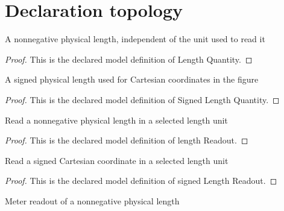 \section{Declaration topology}
\begin{definition}
  \label{def:physics:phyx-mini-0316:phyxminiproblems-problemphyxmini0316-lengthquantity}
  A nonnegative physical length, independent of the unit used to read it
\end{definition}
\begin{proof}
  This is the declared model definition of Length Quantity.
\end{proof}
\begin{definition}
  \label{def:physics:phyx-mini-0316:phyxminiproblems-problemphyxmini0316-signedlengthquantity}
  A signed physical length used for Cartesian coordinates in the figure
\end{definition}
\begin{proof}
  This is the declared model definition of Signed Length Quantity.
\end{proof}
\begin{definition}
  \label{def:physics:phyx-mini-0316:phyxminiproblems-problemphyxmini0316-lengthreadout}
  Read a nonnegative physical length in a selected length unit
\end{definition}
\begin{proof}
  This is the declared model definition of length Readout.
\end{proof}
\begin{definition}
  \label{def:physics:phyx-mini-0316:phyxminiproblems-problemphyxmini0316-signedlengthreadout}
  Read a signed Cartesian coordinate in a selected length unit
\end{definition}
\begin{proof}
  This is the declared model definition of signed Length Readout.
\end{proof}
\begin{definition}
  \label{def:physics:phyx-mini-0316:phyxminiproblems-problemphyxmini0316-lengthinmeters}
  Meter readout of a nonnegative physical length
\end{definition}
